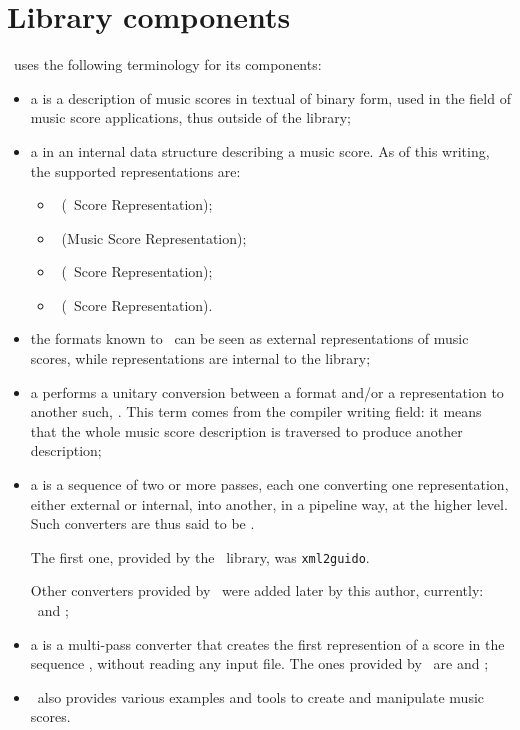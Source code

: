 
\chapter{Library components}\label{Library components}

\mf\ uses the following terminology for its components:
\begin{itemize}
\item a  is a description of music scores in textual of binary form, used in the field of music score applications, thus outside of the library;

\item a  in an internal data structure describing a music score. As of this writing, the supported representations are:
\begin{itemize}
\item \mxsrRepr\ (\mxml\ Score Representation);
\item \msrRepr\ (Music Score Representation);
\item \lpsrRepr\ (\lily\ Score Representation);
\item \bsrRepr\ (\braille\ Score Representation).

\end{itemize}

\item the formats known to \mf\ can be seen as external representations of music scores, while representations are internal to the library;

\item a  performs a unitary conversion between a format and/or a representation to another such, . This term comes from the compiler writing field: it means that the whole music score description is traversed to produce another description;

\item a  is a sequence of two or more passes, each one converting one representation, either external or internal, into another, in a pipeline way, at the higher level. \\
Such converters are thus said to be .

The first one, provided by the \libmusicxml\ library, was {\tt xml2guido}.

Other converters provided by \mf\ were added later by this author, currently: \xmlToLy\, \xmlToBrl\, \xmlToXml\ and \xmlToGuido;

\item a  is a multi-pass converter that creates the first represention of a score in the sequence , without reading any input file. The ones provided by \mf\ are  and ;

\item \mf\ also provides various examples and tools to create and manipulate music scores.%
\end{itemize}

